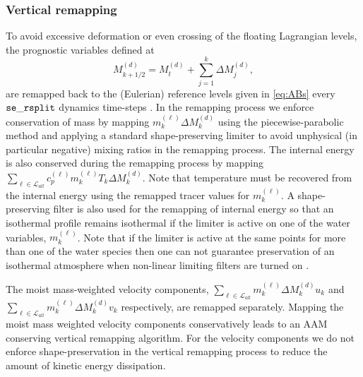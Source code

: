 \documentclass{agujournal}
\begin{document}
\subsubsection{Vertical remapping}\label{sec:verticalRemappin}
To avoid excessive deformation or even crossing of the floating Lagrangian levels, the prognostic variables defined at
\begin{equation}
M^{(d)}_{k+1/2}=M^{(d)}_t+\sum_{j=1}^{k}\Delta M^{(d)}_j,
\end{equation}
are remapped back to the (Eulerian) reference levels given in \eqref{eq:ABs} every ${\tt{se\_rsplit}}$ dynamics time-steps \citep{L2004MWR}. In the remapping process we enforce conservation of mass by mapping $m^{(\ell)}_k\Delta M^{(d)}_k$ using the piecewise-parabolic method \cite[PPM; ][]{CW1984JCP} and applying a standard shape-preserving limiter to avoid unphysical (in particular negative) mixing ratios in the remapping process. The internal energy is also conserved during the remapping process by mapping $\sum_{\ell \in \mathcal{L}_{all}} c_p^{(\ell)} m_k^{(\ell)}T_k \Delta M^{(d)}_k$. Note that temperature must be recovered from the internal energy using the remapped tracer values for $m^{(\ell)}_k$. A shape-preserving filter is also used for the remapping of internal energy so that an isothermal profile remains isothermal if the limiter is active on one of the water variables, $m^{(\ell)}_k$. Note that if the limiter is active at the same points for more than one of the water species then one can not guarantee preservation of an isothermal atmosphere when non-linear limiting filters are turned on \citep[see, e.g., Section 2.5 in ][]{LT2011QJR}.

The moist mass-weighted velocity components, $\sum_{\ell \in \mathcal{L}_{all}} m^{(\ell)}_k \Delta M^{(d)}_k u_k$ and $\sum_{\ell \in \mathcal{L}_{all}} m_k^{(\ell)} \Delta M^{(d)}_k v_k$ respectively, are remapped separately. Mapping the moist mass weighted velocity components conservatively leads to an AAM conserving vertical remapping algorithm. For the velocity components we do not enforce shape-preservation in the vertical remapping process to reduce the amount of kinetic energy dissipation.
\end{document}
